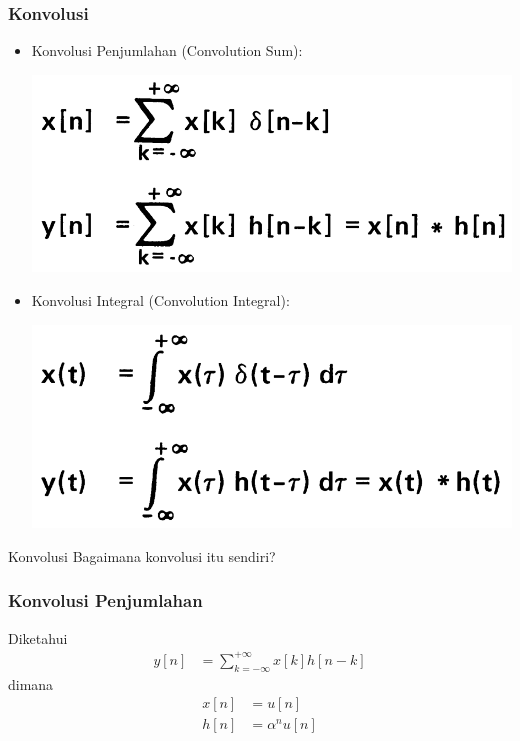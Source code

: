 \documentclass[pdflatex,compress,mathserif]{beamer}
\begin{document}
\begin{frame}
	\frametitle{Konvolusi}
	\begin{itemize}
		\item Konvolusi Penjumlahan (Convolution Sum):
		\begin{center}
			\includegraphics[width=0.6\linewidth]{img/img06}
		\end{center}
		\item Konvolusi Integral (Convolution Integral):
		\begin{center}
			\includegraphics[width=0.6\linewidth]{img/img07}
		\end{center}
	\end{itemize}
\end{frame}

\begin{frame}{Konvolusi}
	Bagaimana konvolusi itu sendiri?
\end{frame}

\begin{frame}
	\frametitle{Konvolusi Penjumlahan}
	Diketahui
	\begin{align*}
		y[n] &= \sum_{k=-\infty}^{+\infty} x[k] h[n-k]
	\end{align*}
	dimana
	\begin{align*}
		x[n] &= u[n] \\
		h[n] &= \alpha^n u[n]
	\end{align*}
\end{frame}
\end{document}
